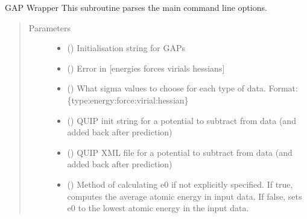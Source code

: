 \documentclass[letterpaper,10pt,english]{sphinxmanual}
\begin{document}
\begin{fulllineitems}
\label{\detokenize{gap:gap.GAP}}
GAP Wrapper
This subroutine parses the main command line options.
\begin{quote}\begin{description}
\item[{Parameters}] \leavevmode\begin{itemize}
\item {} 
 () \textendash{} Initialisation string for GAPs

\item {} 
 () \textendash{} Error in {[}energies forces virials hessians{]}

\item {} 
 () \textendash{} What sigma values to choose for each type of data. Format:
\{type:energy:force:virial:hessian\}

\item {} 
 () \textendash{} QUIP init string for a potential to subtract from data (and added back after prediction)

\item {} 
 () \textendash{} QUIP XML file for a potential to subtract from data (and added back after prediction)

\item {} 
 () \textendash{} Method of calculating e0 if not explicitly specified. If true, computes the average atomic
energy in input data. If false, sets e0 to the lowest atomic energy in the input data.


\end{itemize}
\end{description}
\end{quote}
\end{fulllineitems}
\end{document}
